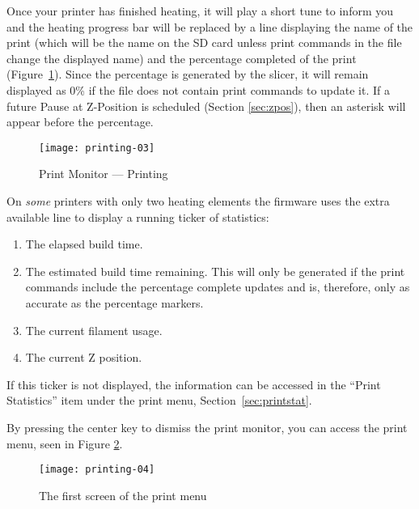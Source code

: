 Once your printer has finished heating, it will play a short tune to inform you and the heating progress bar will be replaced by a line displaying the name of the print (which will be the name on the SD card unless print commands in the file change the displayed name) and the percentage completed of the print (Figure~\ref{fig:print}).  Since the percentage is generated by the \gls{slicer}, it will remain displayed as 0\% if the file does not contain print commands to update it.  If a future Pause at Z-Position is scheduled (Section \ref{sec:zpos}), then an asterisk will appear before the percentage.

\begin{figure}[!htbp]
  \centering
    \texttt{[image: printing-03]}
    \caption{Print Monitor --- Printing}
  \label{fig:print}
\end{figure}

On \emph{some} printers with only two heating elements the firmware uses the extra available line to display a running ticker of statistics:
\begin{enumerate}
\item The elapsed build time.
\item The estimated build time remaining.  This will only be generated if the print commands include the percentage complete updates and is, therefore, only as accurate as the percentage markers.
\item The current filament usage.
\item The current Z position.
\end{enumerate}
If this ticker is not displayed, the information can be accessed in the ``Print Statistics'' item under the print menu, Section~\ref{sec:printstat}.

By pressing the center key to dismiss the print monitor, you can access the print menu, seen in Figure \ref{fig:printeth-menueth}.

\begin{figure}[!htbp]
  \centering
    \texttt{[image: printing-04]}
    \caption{The first screen of the print menu}
  \label{fig:printeth-menueth}
\end{figure}


